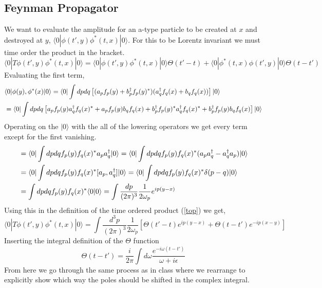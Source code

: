 \documentclass{article}
\numberwithin{equation}{section}
\newcommand{\dpint}{\int \frac{d^3p}{(2\pi)^3}}
\newcommand{\beq}{\begin{equation}}
\newcommand{\eeq}{\end{equation}}
\begin{document}
\subsection{Feynman Propagator}
\newcommand{\bracket}[3]{\langle #1 | #2 | #3 \rangle}
\newcommand{\ff}[2]{ f_{#1}(#2)}
We want to evaluate the amplitude for an a-type particle to be created at $x$ and destroyed at $y$, $\bracket{0}{\phi(t',y)\phi^*(t,x)}{0}$. For this to be Lorentz
invariant we must time order the product in the bracket.
\beq \label{top}
    \bracket{0}{T\phi(t',y)\phi^*(t,x)}{0} = \bracket{0}{\phi(t',y)\phi^*(t,x)}{0} \Theta(t'-t) + \bracket{0}{\phi^*(t,x)\phi(t',y)}{0} \Theta(t-t')
\eeq 
Evaluating the first term,
\beq \begin{split}
    &\bracket{0}{\phi(y),\phi^*(x)}{0} = \bracket{0}{\int dp dq \left[(a_p \ff{p}{y}+ b\dg_p \ff{p}{y}^*)(a\dg_q \ff{q}{x} + b_q \ff{q}{x})\right]   }{0} \\
    & = \bracket{0}{\int dp dq \left[ a_p \ff{p}{y} a\dg_q \ff{q}{x}^* + a_p\ff{p}{y}b_q\ff{q}{x} + b\dg_p \ff{p}{y}^* a\dg_q \ff{q}{x}^* + b\dg_p \ff{p}{y} b_q \ff{q}{x}  \right]  }{0} \\
\end{split}\eeq
Operating on the $|0\rangle$ with the all of the lowering operators we get every term except for the first vanishing.
\beq \begin{split}
    &= \bracket{0}{\int dp dq \ff{p}{y} \ff{q}{x}^* a_p a\dg_q  }  {0} = \bracket{0}{\int dp dq \ff{p}{y} \ff{q}{x}^* (a_p a\dg_q - a\dg_q a_p ) }  {0} \\
    &= \bracket{0}{\int dp dq  \ff{p}{y} \ff{q}{x}^* [a_p, a\dg_q]    }{0} = \bracket{0}{\int dp dq  \ff{p}{y} \ff{q}{x}^* \delta(p-q)    }{0} \\
    &= \int dp dq  \ff{p}{y} \ff{q}{x}^* \langle 0 | 0 \rangle = \int \frac{dp}{(2\pi)^3} \frac{1}{2\omega_p} e^{ip(y-x)} \\
\end{split} \eeq
Using this in the definition of the time ordered product (\ref{top}) we get,
\beq 
    \bracket{0}{T\phi(t',y)\phi^*(t,x)}{0} =\dpint\frac{1}{2\omega_p}\left[ \Theta(t'-t)e^{ip(y-x)} + \Theta(t-t')e^{-ip(x-y)}\right]
\eeq 
Inserting the integral definition of the $\Theta$ function
\beq
    \Theta(t-t') = \frac{i}{2\pi} \int d\omega \frac{e^{-i\omega(t-t')}}{\omega + i\epsilon}
\eeq
From here we go through the same process as in class where we rearrange to explicitly show which way the poles should be shifted in the complex integral.
\end{document}
